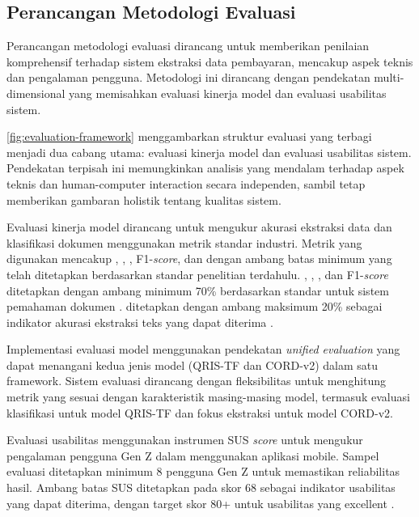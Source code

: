 \subsection{Perancangan Metodologi Evaluasi}
\label{subsec:perancangan-metodologi-evaluasi}

Perancangan metodologi evaluasi dirancang untuk memberikan penilaian komprehensif terhadap sistem ekstraksi data pembayaran, mencakup aspek teknis dan pengalaman pengguna. Metodologi ini dirancang dengan pendekatan multi-dimensional yang memisahkan evaluasi kinerja model dan evaluasi usabilitas sistem.


\autoref{fig:evaluation-framework} menggambarkan struktur evaluasi yang terbagi menjadi dua cabang utama: evaluasi kinerja model dan evaluasi usabilitas sistem. Pendekatan terpisah ini memungkinkan analisis yang mendalam terhadap aspek teknis dan human-computer interaction secara independen, sambil tetap memberikan gambaran holistik tentang kualitas sistem.

Evaluasi kinerja model dirancang untuk mengukur akurasi ekstraksi data dan klasifikasi dokumen menggunakan metrik standar industri. Metrik yang digunakan mencakup \accuracy{}, \precision{}, \recall{}, F1-\emph{score}, dan \mcer{} dengan ambang batas minimum yang telah ditetapkan berdasarkan standar penelitian terdahulu. \accuracy{}, \precision{}, \recall{}, dan F1-\emph{score} ditetapkan dengan ambang minimum 70\% berdasarkan standar untuk sistem pemahaman dokumen \parencite{kim2021donut, xu2020layoutlm}. \mcer{} ditetapkan dengan ambang maksimum 20\% sebagai indikator akurasi ekstraksi teks yang dapat diterima \parencite{holley2009ocr}.

Implementasi evaluasi model menggunakan pendekatan \emph{unified evaluation} yang dapat menangani kedua jenis model (QRIS-TF dan CORD-v2) dalam satu framework. Sistem evaluasi dirancang dengan fleksibilitas untuk menghitung metrik yang sesuai dengan karakteristik masing-masing model, termasuk evaluasi klasifikasi untuk model QRIS-TF dan fokus ekstraksi untuk model CORD-v2.

Evaluasi usabilitas menggunakan instrumen SUS \emph{score} untuk mengukur pengalaman pengguna Gen Z dalam menggunakan aplikasi mobile. Sampel evaluasi ditetapkan minimum 8 pengguna Gen Z untuk memastikan reliabilitas hasil. Ambang batas SUS ditetapkan pada skor 68 sebagai indikator usabilitas yang dapat diterima, dengan target skor 80+ untuk usabilitas yang excellent \parencite{bangor2009determining}.

